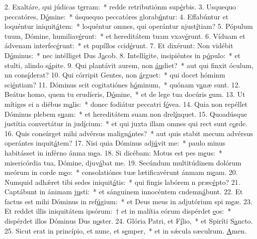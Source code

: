 2. Exaltáre, qui júdicas t\uline{e}rram:~* redde retributiónm sup\uline{é}rbis.
3. Usquequo peccatóres, D\uline{ó}mine:~* úsquequo peccatóres glorab\uline{ú}ntur:
4. Effabúntur et loquéntur iniquit\uline{á}tem:~* loquéntur omnes, qui operántur njust\uline{í}tiam?
5. Pópulum tuum, Dómine, humiliav\uline{é}runt:~* et hereditátem tuam vxav\uline{é}runt.
6. Víduam et ádvenam interfec\uline{é}runt:~* et pupíllos ccid\uline{é}runt.
7. Et dixérunt: Non vidébit D\uline{ó}minus:~* nec intélliget Dus J\uline{a}cob.
8. Intellígite, insipiéntes in p\uline{ó}pulo:~* et stulti, alindo s\uline{á}pite.
9. Qui plantávit aurem, non \uline{áu}diet?~* aut qui finxit óculum, nn cons\uline{í}derat?
10. Qui córripit Gentes, non \uline{á}rguet:~* qui docet hóminm sci\uline{é}ntiam?
11. Dóminus scit cogitatiónes h\uline{ó}minum,~* quónam v\uline{a}næ sunt.
12. Beátus homo, quem tu erudíeris, D\uline{ó}mine,~* et de lege tua docúris \uline{e}um.
13. Ut mítiges ei a diébus m\uline{a}lis:~* donec fodiátur peccatri f\uline{ó}vea.
14. Quia non repéllet Dóminus plebem s\uline{u}am:~* et hereditátem suam non drel\uline{í}nquet.
15. Quoadúsque justítia convertátur in jud\uline{í}cium:~* et qui juxta illam omnes qui rect sunt c\uline{o}rde.
16. Quis consúrget mihi advérsus malign\uline{á}ntes?~* aut quis stabit mecum advérsus operántes inquit\uline{á}tem?
17. Nisi quia Dóminus adj\uline{ú}vit me:~* paulo minus habitásset in inférno ánma m\uline{e}a.
18. Si dicébam: Motus est pes m\uline{e}us:~* misericórdia tua, Dómine, djuv\uline{á}bat me.
19. Secúndum multitúdinem dolórum meórum in corde m\uline{e}o:~* consolatiónes tuæ lætificavérunt ánmam m\uline{e}am.
20. Numquid adhǽret tibi sedes iniquit\uline{á}tis:~* qui fingis labórem n præc\uline{é}pto?
21. Captábunt in ánimam j\uline{u}sti:~* et sánguinem innocéntem cndemn\uline{á}bunt.
22. Et factus est mihi Dóminus in ref\uline{ú}gium:~* et Deus meus in adjutórium spi m\uline{e}æ.
23. Et reddet illis iniquitátem ipsórum:~† et in malítia eórum dispérdet \uline{e}os:~* dispérdet illos Dóminus Dus n\uline{o}ster.
24. Glória Patri, et F\uline{í}lio,~* et Spiríti S\uline{a}ncto.
25. Sicut erat in princípio, et nunc, et s\uline{e}mper,~* et in sǽcula sæculrum. \uline{A}men.
